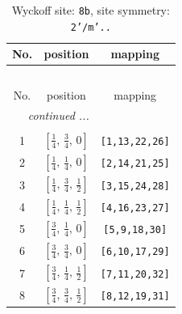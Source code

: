 \documentclass[fleqn,8pt]{jsarticle}
\begin{document}
\begin{longtable}{ccc}
\caption{Wyckoff site: {\tt 8b}, site symmetry: {\tt 2'/m'..}}
 \\
 \hline \hline
No. & position & mapping \\ \hline \endfirsthead

\multicolumn{2}{l}{\tablename\ \thetable{}} \\
 \hline \hline
No. & position & mapping \\ \hline \endhead

 \hline \hline
\multicolumn{2}{r}{\footnotesize\it continued ...} \\ \endfoot

 \hline \hline
\multicolumn{2}{r}{} \\ \endlastfoot

1 & $\left[ \frac{1}{4},\, \frac{3}{4},\, 0 \right]$ & {\tt [1,13,22,26]} \\ \hline
2 & $\left[ \frac{1}{4},\, \frac{1}{4},\, 0 \right]$ & {\tt [2,14,21,25]} \\ \hline
3 & $\left[ \frac{1}{4},\, \frac{3}{4},\, \frac{1}{2} \right]$ & {\tt [3,15,24,28]} \\ \hline
4 & $\left[ \frac{1}{4},\, \frac{1}{4},\, \frac{1}{2} \right]$ & {\tt [4,16,23,27]} \\ \hline
5 & $\left[ \frac{3}{4},\, \frac{1}{4},\, 0 \right]$ & {\tt [5,9,18,30]} \\ \hline
6 & $\left[ \frac{3}{4},\, \frac{3}{4},\, 0 \right]$ & {\tt [6,10,17,29]} \\ \hline
7 & $\left[ \frac{3}{4},\, \frac{1}{4},\, \frac{1}{2} \right]$ & {\tt [7,11,20,32]} \\ \hline
8 & $\left[ \frac{3}{4},\, \frac{3}{4},\, \frac{1}{2} \right]$ & {\tt [8,12,19,31]} \\
\end{longtable}
\renewcommand{\arraystretch}{1.2}
\end{document}
